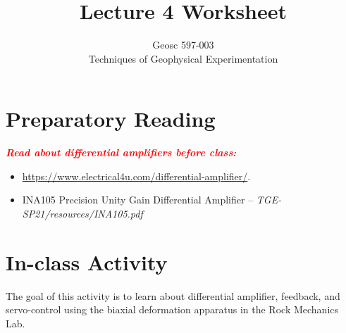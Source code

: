 \documentclass[10pt]{article}
\begin{document}

\title{Lecture 4 Worksheet}
\author{Geosc 597-003\\
Techniques of Geophysical Experimentation} 

\maketitle

\section*{Preparatory Reading}

\textcolor{red}{\textbf{\textit{Read about differential amplifiers before class:}}}
\begin{itemize}
	\item \url{https://www.electrical4u.com/differential-amplifier/}.
	\item INA105 Precision Unity Gain Differential Amplifier -- \textit{TGE-SP21/resources/INA105.pdf}
\end{itemize}


\section*{In-class Activity}
The goal of this activity is to learn about differential amplifier, feedback, and servo-control using the biaxial deformation apparatus in the Rock Mechanics Lab.\\
\end{document}
